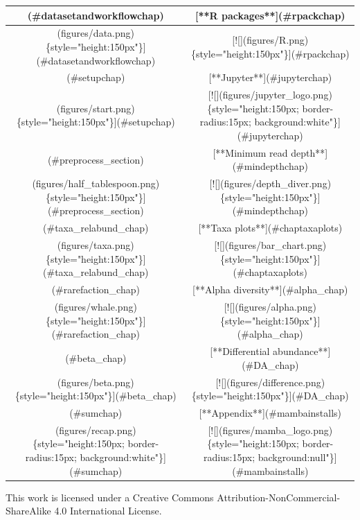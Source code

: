\documentclass[
]{book}
\begin{document}
\begin{table}
\centering
\begin{tabular}[t]{c|c}
\hline
[**Intro**](\#datasetandworkflowchap) & [**R packages**](\#rpackchap)\\
\hline
[![](figures/data.png)\{style="height:150px"\}](\#datasetandworkflowchap) & [![](figures/R.png)\{style="height:150px"\}](\#rpackchap)\\
\hline
[**Set-up**](\#setupchap) & [**Jupyter**](\#jupyterchap)\\
\hline
[![](figures/start.png)\{style="height:150px"\}](\#setupchap) & [![](figures/jupyter\_logo.png)\{style="height:150px; border-radius:15px; background:white"\}](\#jupyterchap)\\
\hline
[**Data preparation**](\#preprocess\_section) & [**Minimum read depth**](\#mindepthchap)\\
\hline
[![](figures/half\_tablespoon.png)\{style="height:150px"\}](\#preprocess\_section) & [![](figures/depth\_diver.png)\{style="height:150px"\}](\#mindepthchap)\\
\hline
[**Taxonomy relative abundance**](\#taxa\_relabund\_chap) & [**Taxa plots**](\#chaptaxaplots)\\
\hline
[![](figures/taxa.png)\{style="height:150px"\}](\#taxa\_relabund\_chap) & [![](figures/bar\_chart.png)\{style="height:150px"\}](\#chaptaxaplots)\\
\hline
[**Rarefaction**](\#rarefaction\_chap) & [**Alpha diversity**](\#alpha\_chap)\\
\hline
[![](figures/whale.png)\{style="height:150px"\}](\#rarefaction\_chap) & [![](figures/alpha.png)\{style="height:150px"\}](\#alpha\_chap)\\
\hline
[**Beta diversity**](\#beta\_chap) & [**Differential abundance**](\#DA\_chap)\\
\hline
[![](figures/beta.png)\{style="height:150px"\}](\#beta\_chap) & [![](figures/difference.png)\{style="height:150px"\}](\#DA\_chap)\\
\hline
[**Summary**](\#sumchap) & [**Appendix**](\#mambainstalls)\\
\hline
[![](figures/recap.png)\{style="height:150px; border-radius:15px; background:white"\}](\#sumchap) & [![](figures/mamba\_logo.png)\{style="height:150px; border-radius:15px; background:null"\}](\#mambainstalls)\\
\hline
\end{tabular}
\end{table}

This work is licensed under a Creative Commons Attribution-NonCommercial-ShareAlike 4.0 International License.
\end{document}
